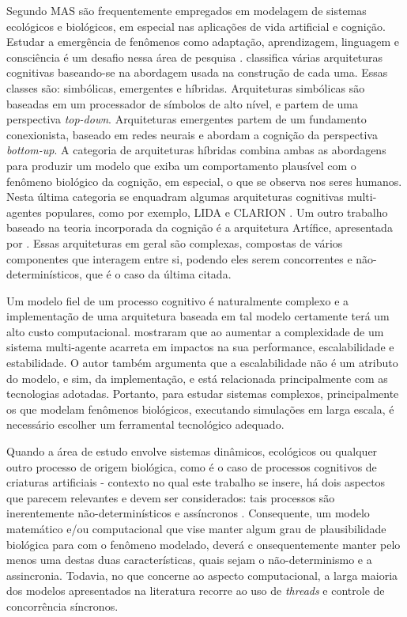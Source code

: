 Segundo  MAS são frequentemente empregados em modelagem de sistemas ecológicos e biológicos, em especial nas aplicações de vida artificial e cognição. Estudar a emergência de fenômenos como adaptação, aprendizagem, linguagem e consciência é um desafio nessa área de pesquisa \cite{Bedau2000}.   classifica várias arquiteturas cognitivas  baseando-se na abordagem usada na construção de cada uma. Essas classes são: simbólicas, emergentes e híbridas. Arquiteturas simbólicas são baseadas em um processador de símbolos de alto nível, e partem de uma perspectiva \textit{top-down}. Arquiteturas emergentes partem de um fundamento conexionista, baseado em redes neurais e abordam a cognição da perspectiva \textit{bottom-up}. A categoria de arquiteturas híbridas combina ambas as abordagens para produzir um modelo que exiba um comportamento plausível com o fenômeno biológico da cognição, em especial, o que se observa nos seres humanos. Nesta última categoria se enquadram algumas arquiteturas cognitivas multi-agentes populares, como por exemplo, LIDA e CLARION \cite{Franklin2006, Sun2001}. Um outro trabalho baseado na teoria incorporada da cognição é a arquitetura Artífice, apresentada por . Essas arquiteturas em geral são complexas, compostas de vários componentes que interagem entre si, podendo eles serem concorrentes e não-determinísticos, que é o caso da última citada.  

Um modelo fiel de um processo cognitivo é naturalmente complexo e a implementação de uma arquitetura baseada em tal modelo certamente terá um alto custo computacional.  mostraram que ao aumentar a complexidade de um sistema multi-agente acarreta em impactos na sua performance, escalabilidade e estabilidade. O autor também argumenta que a escalabilidade não é um atributo do modelo, e sim, da implementação, e está relacionada principalmente com as tecnologias adotadas. Portanto, para estudar sistemas complexos, principalmente os que modelam fenômenos biológicos, executando simulações em larga escala, é necessário escolher um ferramental tecnológico adequado.

Quando a área de estudo envolve sistemas dinâmicos, ecológicos ou qualquer outro processo de origem biológica, como é o caso de processos cognitivos de criaturas artificiais - contexto no qual este trabalho se insere, há dois aspectos que parecem relevantes e devem ser considerados: tais processos são inerentemente não-determinísticos \cite{Symmons2016} e assíncronos \cite{Fisher2008, Strombom2017, Wang2016}. Consequente, um modelo matemático e/ou computacional que vise manter algum grau de plausibilidade biológica para com o fenômeno modelado, deverá c    onsequentemente manter pelo menos uma destas duas características, quais sejam o não-determinismo e a assincronia. Todavia, no que concerne ao aspecto computacional, a larga maioria dos modelos apresentados na literatura recorre ao uso de \textit{threads} e controle de concorrência síncronos. 

